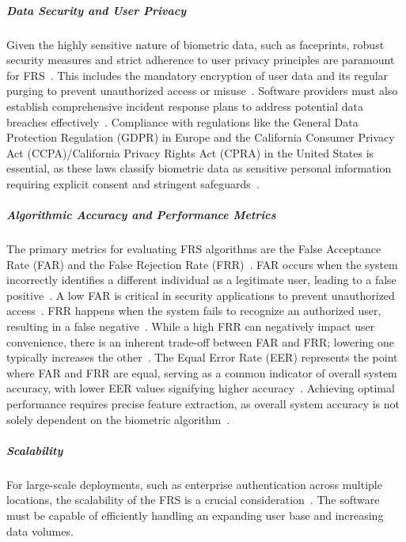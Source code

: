 \subparagraph{Data Security and User Privacy}
Given the highly sensitive nature of biometric data, such as faceprints, robust security measures and strict adherence to user privacy principles are paramount for FRS~\cite{getfocal_biometric_2025, transcend_ccpa_2025}. This includes the mandatory encryption of user data and its regular purging to prevent unauthorized access or misuse~\cite{getfocal_biometric_2025}. Software providers must also establish comprehensive incident response plans to address potential data breaches effectively~\cite{getfocal_biometric_2025}. Compliance with regulations like the General Data Protection Regulation (GDPR) in Europe and the California Consumer Privacy Act (CCPA)/California Privacy Rights Act (CPRA) in the United States is essential, as these laws classify biometric data as sensitive personal information requiring explicit consent and stringent safeguards~\cite{getfocal_biometric_2025, transcend_ccpa_2025}.

\subparagraph{Algorithmic Accuracy and Performance Metrics}
The primary metrics for evaluating FRS algorithms are the False Acceptance Rate (FAR) and the False Rejection Rate (FRR)~\cite{recfaces_false_2025, kairos_secret_2018}. FAR occurs when the system incorrectly identifies a different individual as a legitimate user, leading to a false positive~\cite{recfaces_false_2025, kairos_secret_2018}. A low FAR is critical in security applications to prevent unauthorized access~\cite{recfaces_false_2025}. FRR happens when the system fails to recognize an authorized user, resulting in a false negative~\cite{recfaces_false_2025, kairos_secret_2018}. While a high FRR can negatively impact user convenience, there is an inherent trade-off between FAR and FRR; lowering one typically increases the other~\cite{recfaces_false_2025, kairos_secret_2018}. The Equal Error Rate (EER) represents the point where FAR and FRR are equal, serving as a common indicator of overall system accuracy, with lower EER values signifying higher accuracy~\cite{recfaces_false_2025, kairos_secret_2018}. Achieving optimal performance requires precise feature extraction, as overall system accuracy is not solely dependent on the biometric algorithm~\cite{kairos_secret_2018}.

\subparagraph{Scalability}
For large-scale deployments, such as enterprise authentication across multiple locations, the scalability of the FRS is a crucial consideration~\cite{securityindustry_2025_transforming}. The software must be capable of efficiently handling an expanding user base and increasing data volumes.

